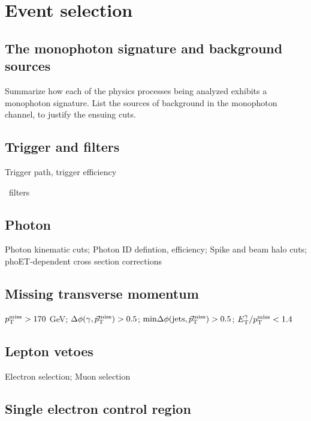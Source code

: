 \documentclass[oneside, letterpaper, 12pt, oldfontcommands]{memoir}
\begin{document}


\chapter{Event selection} \label{chap:event_selection}
\section{The monophoton signature and background sources} \label{sec:event_selection_backgrounds}
Summarize how each of the physics processes being analyzed exhibits a monophoton signature.
List the sources of background in the monophoton channel, to justify the ensuing cuts.
\section{Trigger and \texorpdfstring{\MET}{pTmiss} filters} \label{sec:event_selection_trigger_METfilters}
Trigger path, trigger efficiency

\MET\ filters
\section{Photon} \label{sec:event_selection_photon}
Photon kinematic cuts; Photon ID defintion, efficiency; Spike and beam halo cuts; phoET-dependent cross section corrections

\section{Missing transverse momentum} \label{sec:event_selection_MET}
$p_\mathrm{T}^\mathrm{miss} > 170$ GeV; $\Delta\phi(\gamma,\vec{p}_\mathrm{T}^\mathrm{miss}) > 0.5$; $\mathrm{min}\Delta\phi(\mathrm{jets},\vec{p}_\mathrm{T}^\mathrm{miss}) > 0.5$;
$E_\mathrm{T}^{\gamma}/p_\mathrm{T}^\mathrm{miss} < 1.4$
\section{Lepton vetoes} \label{sec:event_selection_lepveto}
Electron selection; Muon selection
\section{Single electron control region} \label{sec:event_selection_monoele}
\end{document}
